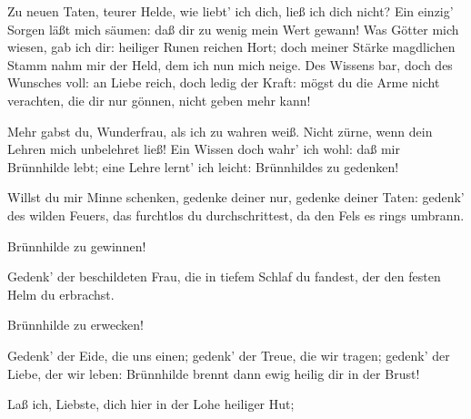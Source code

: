 \begin{drama}








\Brunnhildespeaks

Zu neuen Taten, teurer Helde,
wie liebt' ich dich, ließ ich dich nicht?
Ein einzig' Sorgen läßt mich säumen:
daß dir zu wenig mein Wert gewann!
Was Götter mich wiesen, gab ich dir:
heiliger Runen reichen Hort;
doch meiner Stärke magdlichen Stamm
nahm mir der Held, dem ich nun mich neige.
Des Wissens bar, doch des Wunsches voll:
an Liebe reich, doch ledig der Kraft:
mögst du die Arme nicht verachten,
die dir nur gönnen, nicht geben mehr kann!
 

\Siegfriedspeaks

Mehr gabst du, Wunderfrau,
als ich zu wahren weiß.
Nicht zürne, wenn dein Lehren
mich unbelehret ließ!
Ein Wissen doch wahr' ich wohl:
daß mir Brünnhilde lebt;
eine Lehre lernt' ich leicht:
Brünnhildes zu gedenken!
 

\Brunnhildespeaks

Willst du mir Minne schenken,
gedenke deiner nur,
gedenke deiner Taten:
gedenk' des wilden Feuers,
das furchtlos du durchschrittest,
da den Fels es rings umbrann.
 

\Siegfriedspeaks

Brünnhilde zu gewinnen!
 

\Brunnhildespeaks

Gedenk' der beschildeten Frau,
die in tiefem Schlaf du fandest,
der den festen Helm du erbrachst.
 

\Siegfriedspeaks

Brünnhilde zu erwecken!
 

\Brunnhildespeaks

Gedenk' der Eide, die uns einen;
gedenk' der Treue, die wir tragen;
gedenk' der Liebe, der wir leben:
Brünnhilde brennt dann ewig
heilig dir in der Brust!
 




\Siegfriedspeaks

Laß ich, Liebste, dich hier
in der Lohe heiliger Hut;



\end{drama}
